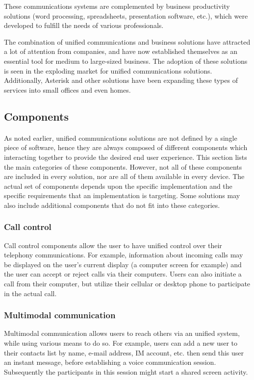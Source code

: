 These communications systems are complemented by business productivity solutions (word processing, spreadsheets, presentation software, etc.), which were developed to fulfill the needs of various professionals.

The combination of unified communications and business solutions have attracted a lot of attention from companies, and have now established themselves as an essential tool for medium to large-sized business. The adoption of these solutions is seen in the exploding market for unified communications solutions\cite{infonetics_research_infonetics:_2012}. Additionally, Asterisk and other solutions have been expanding these types of services into small offices and even homes.


\subsection{Components}

\paragraph{}
As noted earlier, unified communications solutions are not defined by a single piece of software, hence they are always composed of different components which interacting together to provide the desired end user experience. This section lists the main categories of these components. However, not all of these components are included in every solution, nor are all of them available in every device. The actual set of components depends upon the specific implementation and the specific requirements that an implementation is targeting. Some solutions may also include additional components that do not fit into these categories\cite{ahamed_comprehensive_2008}.

\subsubsection{Call control}
Call control components allow the user to have unified control over their telephony communications. For example, information about incoming calls may be displayed on the user's current display (a computer screen for example) and the user can accept or reject calls via their computers. Users can also initiate a call from their computer, but utilize their cellular or desktop phone to participate in the actual call.

\subsubsection{Multimodal communication}
Multimodal communication allows users to reach others via an unified system, while using various means to do so.
For example, users can add a new user to their contacts list by name,  e-mail address, IM account, etc. then send this user an instant message, before establishing a voice communication session. Subsequently the participants in this session might start a shared screen activity.

